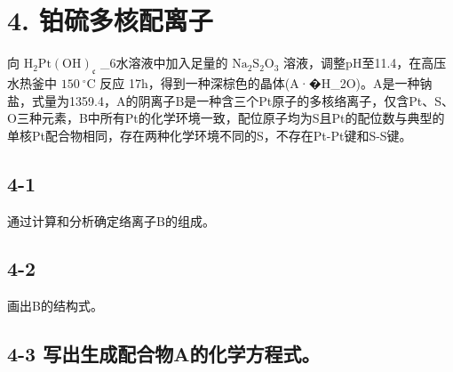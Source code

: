 \section*{4. 铂硫多核配离子}
向 $\mathrm { H _ { 2 } P t ( O H ) } _ { \mathfrak { c } }$ _{6}⽔溶液中加⼊⾜量的 $\mathrm { N a _ { 2 } S _ { 2 } O _ { 3 } }$ 溶液，调整pH⾄11.4，在⾼压⽔热釜中 $1 5 0 ~ ^ { \circ } \mathrm { C }$ 反应 17h，得到⼀种深棕⾊的晶体(A·�H_{2}O)。A是⼀种钠盐，式量为1359.4，A的阴离⼦B是⼀种含三个Pt原⼦的多核络离⼦，仅含Pt、S、O三种元素，B中所有Pt的化学环境⼀致，配位原⼦均为S且Pt的配位数与典型的单核Pt配合物相同，存在两种化学环境不同的S，不存在Pt-Pt键和S-S键。

\subsection*{4-1}
通过计算和分析确定络离⼦B的组成。

\subsection*{4-2}
画出B的结构式。

\subsection*{4-3 写出⽣成配合物A的化学⽅程式。}
